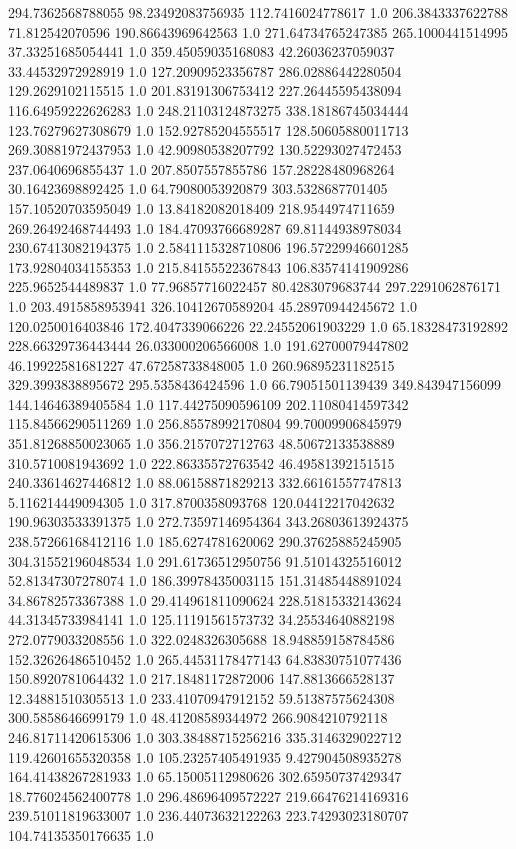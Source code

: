 294.7362568788055	98.23492083756935	112.7416024778617	1.0
206.3843337622788	71.812542070596	190.86643969642563	1.0
271.64734765247385	265.1000441514995	37.33251685054441	1.0
359.45059035168083	42.26036237059037	33.44532972928919	1.0
127.20909523356787	286.02886442280504	129.2629102115515	1.0
201.83191306753412	227.26445595438094	116.64959222626283	1.0
248.21103124873275	338.18186745034444	123.76279627308679	1.0
152.92785204555517	128.50605880011713	269.30881972437953	1.0
42.90980538207792	130.52293027472453	237.0640696855437	1.0
207.8507557855786	157.28228480968264	30.16423698892425	1.0
64.79080053920879	303.5328687701405	157.10520703595049	1.0
13.84182082018409	218.9544974711659	269.26492468744493	1.0
184.47093766689287	69.81144938978034	230.67413082194375	1.0
2.5841115328710806	196.57229946601285	173.92804034155353	1.0
215.84155522367843	106.83574141909286	225.9652544489837	1.0
77.96857716022457	80.4283079683744	297.2291062876171	1.0
203.4915858953941	326.10412670589204	45.28970944245672	1.0
120.0250016403846	172.4047339066226	22.24552061903229	1.0
65.18328473192892	228.66329736443444	26.033000206566008	1.0
191.62700079447802	46.19922581681227	47.67258733848005	1.0
260.96895231182515	329.3993838895672	295.5358436424596	1.0
66.79051501139439	349.843947156099	144.14646389405584	1.0
117.44275090596109	202.11080414597342	115.84566290511269	1.0
256.85578992170804	99.70009906845979	351.81268850023065	1.0
356.2157072712763	48.50672133538889	310.5710081943692	1.0
222.86335572763542	46.49581392151515	240.33614627446812	1.0
88.06158871829213	332.66161557747813	5.116214449094305	1.0
317.8700358093768	120.04412217042632	190.96303533391375	1.0
272.73597146954364	343.26803613924375	238.57266168412116	1.0
185.6274781620062	290.37625885245905	304.31552196048534	1.0
291.61736512950756	91.51014325516012	52.81347307278074	1.0
186.39978435003115	151.31485448891024	34.86782573367388	1.0
29.414961811090624	228.51815332143624	44.31345733984141	1.0
125.11191561573732	34.25534640882198	272.0779033208556	1.0
322.0248326305688	18.948859158784586	152.32626486510452	1.0
265.44531178477143	64.83830751077436	150.8920781064432	1.0
217.18481172872006	147.8813666528137	12.34881510305513	1.0
233.41070947912152	59.51387575624308	300.5858646699179	1.0
48.41208589344972	266.9084210792118	246.81711420615306	1.0
303.38488715256216	335.3146329022712	119.42601655320358	1.0
105.23257405491935	9.427904508935278	164.41438267281933	1.0
65.15005112980626	302.65950737429347	18.776024562400778	1.0
296.48696409572227	219.66476214169316	239.51011819633007	1.0
236.44073632122263	223.74293023180707	104.74135350176635	1.0
